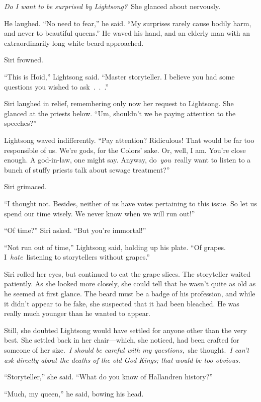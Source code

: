 \textit{Do I want to be surprised by Lightsong?}~She glanced about nervously.

He laughed. “No need to fear,” he said. “My surprises rarely cause bodily harm, and never to beautiful queens.” He waved his hand, and an elderly man with an extraordinarily long white beard approached.

Siri frowned.

“This is Hoid,” Lightsong said. “Master storyteller. I believe you had some questions you wished to ask~.~.~.”

Siri laughed in relief, remembering only now her request to Lightsong. She glanced at the priests below. “Um, shouldn’t we be paying attention to the speeches?”

Lightsong waved indifferently. “Pay attention? Ridiculous! That would be far too responsible of us. We’re gods, for the Colors’ sake. Or, well, I am. You’re close enough. A god-in-law, one might say. Anyway, do~\textit{you}~really want to listen to a bunch of stuffy priests talk about sewage treatment?”

Siri grimaced.

“I thought not. Besides, neither of us have votes pertaining to this issue. So let us spend our time wisely. We never know when we will run out!”

“Of time?” Siri asked. “But you’re immortal!”

“Not run out of time,” Lightsong said, holding up his plate. “Of grapes. I~\textit{hate}~listening to storytellers without grapes.”

Siri rolled her eyes, but continued to eat the grape slices. The storyteller waited patiently. As she looked more closely, she could tell that he wasn’t quite as old as he seemed at first glance. The beard must be a badge of his profession, and while it didn’t appear to be fake, she suspected that it had been bleached. He was really much younger than he wanted to appear.

Still, she doubted Lightsong would have settled for anyone other than the very best. She settled back in her chair—which, she noticed, had been crafted for someone of her size.~\textit{I should be careful with my questions,}~she thought.~\textit{I can’t ask directly about the deaths of the old God Kings; that would be too obvious.}

“Storyteller,” she said. “What do you know of Hallandren history?”

“Much, my queen,” he said, bowing his head.

